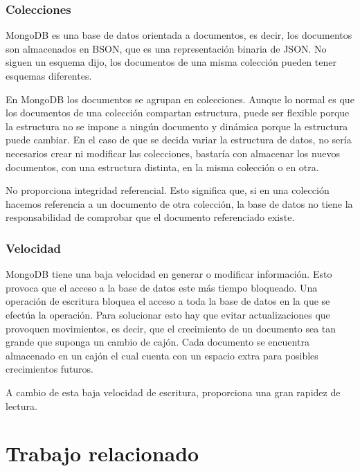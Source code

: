 \documentclass[a4paper, 12pt]{book}
\begin{document}
\subsubsection{Colecciones}
\label{subsec:estilo}

MongoDB es una base de datos orientada a documentos, es decir, los documentos son almacenados
en BSON, que es una representaci\'on binaria de JSON. No siguen un esquema dijo,
los documentos de una misma colecci\'on pueden tener esquemas diferentes.

En MongoDB los documentos se agrupan en colecciones. Aunque lo normal es que los documentos
de una colecci\'on compartan estructura, puede ser flexible porque la estructura no se
impone a ning\'un documento y din\'amica porque la estructura puede cambiar. En el caso de que se
decida variar la estructura de datos, no ser\'ia necesarios crear ni modificar las colecciones, bastar\'ia con almacenar los nuevos documentos, con una estructura distinta, en la misma colecci\'on
o en otra.

No proporciona integridad referencial. Esto significa que, si en una colecci\'on hacemos referencia
a un documento de otra colecci\'on, la base de datos no tiene la responsabilidad de comprobar
que el documento referenciado existe.


\subsubsection{Velocidad}
\label{subsec:estilo}

MongoDB tiene una baja velocidad en generar o modificar informaci\'on. Esto provoca que
el acceso a la base de datos este m\'as tiempo bloqueado. Una operaci\'on de escritura bloquea el
acceso a toda la base de datos en la que se efect\'ua la operaci\'on. Para solucionar esto hay que
evitar actualizaciones que provoquen movimientos, es decir, que el crecimiento de un documento
sea tan grande que suponga un cambio de caj\'on. Cada documento se encuentra almacenado
en un caj\'on el cual cuenta con un espacio extra para posibles crecimientos futuros.

A cambio de esta baja velocidad de escritura, proporciona una gran rapidez de lectura.



\section{Trabajo relacionado}
\label{sec:relacionado}
\end{document}
